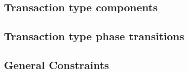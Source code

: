 \subsection{Transaction type \rlp{} components}      \label{rlp txn v2: generalities: transaction type rlp components}    
\subsection{Transaction type phase transitions}      \label{rlp txn v2: generalities: admissible rlp component flags}     
\subsection{General Constraints}                     \label{rlp txn v2: generalities: indices and limb constructed}       
